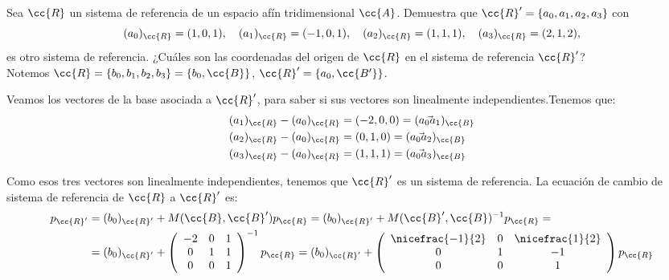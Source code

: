 \begin{ejercicio}
     Sea $\cc{R}$ un sistema de referencia de un espacio afín tridimensional $\cc{A}$. Demuestra que $\cc{R}' = \{a_0, a_1, a_2, a_3\}$ con
     $$(a_{0})_{\cc{R}} = (1, 0, 1),\quad (a_{1})_{\cc{R}} = (-1, 0, 1),\quad (a_{2})_{\cc{R}} = (1, 1, 1),\quad (a_{3})_{\cc{R}} = (2, 1, 2),$$
     es otro sistema de referencia. ¿Cuáles son las coordenadas del origen de $\cc{R}$ en el sistema de referencia $\cc{R}'$?\\

     Notemos $\cc{R} = \{b_0, b_1, b_2, b_3\} = \{b_0, \cc{B}\}$, $\cc{R}'=\{a_0,\cc{B'}\}$.

     Veamos los vectores de la base asociada a $\cc{R}'$, para saber si sus vectores son linealmente independientes.Tenemos que:
     \begin{equation*}\begin{split}
         (a_{1})_{\cc{R}}-(a_{0})_{\cc{R}}&=(-2,0,0)=(\vec{a_0a_1})_{\cc{B}} \\
         (a_{2})_{\cc{R}}-(a_{0})_{\cc{R}}&=(0,1,0)=(\vec{a_0a_2})_{\cc{B}} \\
         (a_{3})_{\cc{R}}-(a_{0})_{\cc{R}}&=(1,1,1)=(\vec{a_0a_3})_{\cc{B}}
     \end{split}\end{equation*}

     Como esos tres vectores son linealmente independientes, tenemos que $\cc{R}'$ es un sistema de referencia. La ecuación de cambio de sistema de referencia de $\cc{R}$ a $\cc{R}'$ es:
     \begin{equation*}\begin{split}
         p_{\cc{R}'} &= (b_0)_{\cc{R}'} + M(\cc{B},\cc{B}')p_{\cc{R}}
         = (b_0)_{\cc{R}'} + M(\cc{B}',\cc{B})^{-1}p_{\cc{R}}
         =\\&= (b_0)_{\cc{R}'} + \left(
            \begin{array}{ccc}
                -2 & 0 & 1 \\
                0 & 1 & 1 \\
                0 & 0 & 1
            \end{array}
         \right)^{-1}p_{\cc{R}}
         = (b_0)_{\cc{R}'} + \left(
            \begin{array}{ccc}
                \nicefrac{-1}{2} & 0 & \nicefrac{1}{2} \\
                0 & 1 & -1 \\
                0 & 0 & 1
            \end{array}
         \right)p_{\cc{R}}
     \end{split}\end{equation*}


\end{ejercicio}
